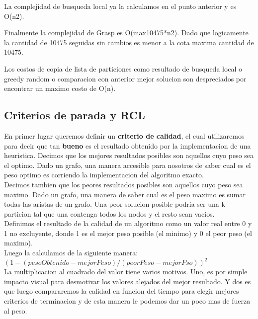 La complejidad de busqueda local ya la calculamos en el punto anterior y es O(n2).

Finalmente la complejidad de Grasp es O(max10475*n2). Dado que logicamente la cantidad de 10475 seguidas sin cambios es menor a la cota maxima cantidad de 10475.

Los costos de copia de lista de particiones como resultado de busqueda local o greedy random o comparacion con anterior mejor solucion son despreciados por encontrar un maximo costo de O(n).


\subsection{Criterios de parada y RCL}

En primer lugar queremos definir un \textbf{criterio de calidad}, el cual utilizaremos para decir que tan \textbf{bueno} es el resultado obtenido por la implementacion de una heuristica.
Decimos que los mejores resultados posibles son aquellos cuyo peso sea el optimo. Dado un grafo, una manera accesible para nosotros de saber cual es el peso optimo es corriendo la implementacion del algoritmo exacto.  \\
Decimos tambien que los peores resultados posibles son aquellos cuyo peso sea maximo. Dado un grafo, una manera de saber cual es el peso maximo es sumar todas las aristas de un grafo. Una peor solucion posible podria ser una k-particion tal que una contenga todos los nodos y el resto sean vacios. \\

Definimos el resultado de la calidad de un algoritmo como un valor real entre 0 y 1 no excluyente, donde 1 es el mejor peso posible (el minimo) y 0 el peor peso (el maximo). \\
Luego la calculamos de la siguiente manera: $ (1 -(pesoObtenido - mejorPeso) / (peorPeso - mejorPso))^{2}$ \\
La multiplicacion al cuadrado del valor tiene varios motivos. Uno, es por simple impacto visual para desmotivar los valores alejados del mejor resultado. Y dos es que luego compararemos la calidad en funcion del tiempo para elegir mejores criterios de terminacion y de esta manera le podemos dar un poco mas de fuerza al peso. \\

